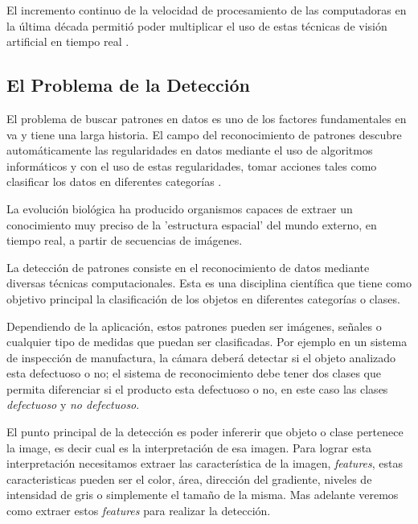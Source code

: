El incremento continuo de la velocidad de procesamiento de las computadoras en la última década permitió poder multiplicar el uso de estas técnicas de visión artificial en tiempo real \citep{Naill}. 

\subsection{El Problema de la Detección}\label{sub:problemadeteccion}
El problema de buscar patrones en datos es uno de los factores fundamentales en \ac{va} y tiene una larga historia. El campo del reconocimiento de patrones  descubre automáticamente las regularidades en datos mediante el uso de algoritmos informáticos y con el uso de estas regularidades, tomar acciones tales como clasificar los datos en diferentes categorías \citep{bishop}. 
\begin{center}
\begin{minipage}{0.8\linewidth}  \vspace{5pt} {\small
La evolución biológica ha producido organismos capaces de extraer un conocimiento muy preciso de la 'estructura espacial' del mundo externo, en tiempo real, a partir de secuencias de imágenes.}
\begin{flushright}
 \citep{percepcion}
\end{flushright}
\end{minipage}
\end{center}

La detección de patrones consiste en el reconocimiento de datos mediante diversas técnicas computacionales. Esta es una disciplina científica que tiene como objetivo principal la clasificación de los objetos en diferentes categorías o clases.

Dependiendo de la aplicación, estos patrones pueden ser imágenes, señales o cualquier tipo de medidas que puedan ser clasificadas. Por ejemplo en un sistema de inspección de manufactura, la cámara deberá detectar si el objeto analizado esta defectuoso o no; el sistema de reconocimiento debe tener dos clases que permita diferenciar si el producto esta defectuoso o no, en este caso las clases \textit{defectuoso} y \textit{no defectuoso}.

El punto principal de la detección es poder infererir que objeto o clase pertenece la image, es decir cual es la interpretación de esa imagen. Para lograr esta interpretación necesitamos extraer las característica de la imagen, \textit{features}, estas caracteristicas pueden ser el color, área, dirección del gradiente, niveles de intensidad de gris o simplemente el tamaño de la misma. Mas adelante veremos como extraer estos \textit{features} para realizar la detección.

